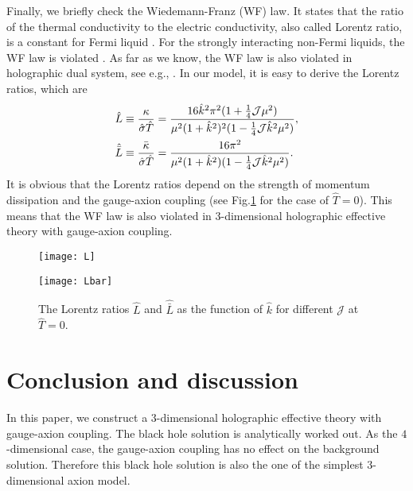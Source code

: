 \documentclass[preprint,onecolumn,nofootinbib]{revtex4}
\begin{document}
Finally, we briefly check the Wiedemann-Franz (WF) law. It states that the ratio of the thermal conductivity to the electric conductivity, also called Lorentz ratio, is a constant for Fermi liquid \cite{ziman2001electrons}. For the strongly
interacting non-Fermi liquids, the WF law is violated \cite{Mahajan:2013cja}.  As far as we know, the WF law is also violated in holographic dual system, see e.g., \cite{Kuang:2017rpx,Kim:2014bza,Donos:2014cya,Wu:2018zdc}.
In our model, it is easy to derive the Lorentz ratios, which are
\begin{align}
	&\hat{L}\equiv \frac{{\kappa }}{{\hat \sigma \hat T}} = \frac{{16{\hat{k}^2}{\pi ^2}(1 + \frac{1}{4}{\cal J}{\mu ^2})}}{{\mu^2(1 + {{\hat k}^2})^2(1 - \frac{1}{4}{\cal J}\hat{k}^2{\mu ^2})}},\\
	&\hat{\bar L }\equiv\frac{\bar \kappa}{\hat{\sigma}\hat{T}}=\frac{16 \pi ^2}{\mu ^2 (1+\hat{k}^2)  (1-\frac{1}{4} \mathcal{J}
		\hat{k}^2 \mu ^2)}.
\end{align}
It is obvious that the Lorentz ratios depend on the strength of momentum dissipation and the gauge-axion coupling (see Fig.\ref{fig:6} for the case of $\hat{T}=0$). This means that the WF law is also violated in $3$-dimensional holographic effective theory with gauge-axion coupling.
\begin{figure}[H]
	\begin{minipage}[t]{0.5\linewidth}
		\centering
		\texttt{[image: L]}
	\end{minipage}
	\begin{minipage}[t]{0.5\linewidth}
		\centering
		\texttt{[image: Lbar]}
	\end{minipage}
	\caption{The Lorentz ratios $\hat{L}$ and $\hat{\bar{L}}$ as the function of $\hat{k}$ for different $\mathcal{J}$ at $\hat{T}=0$.}
	\label{fig:6}
\end{figure}




\section{Conclusion and discussion}\label{conclu}

In this paper, we construct a $3$-dimensional holographic effective theory with gauge-axion coupling. The black hole solution is analytically worked out. As the $4$-dimensional case, the gauge-axion coupling has no effect on the background solution. Therefore this black hole solution is also the one of the simplest $3$-dimensional axion model.
\end{document}

